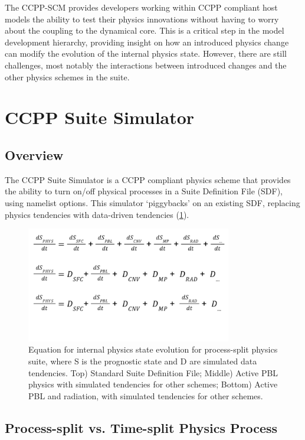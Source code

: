The CCPP-SCM provides developers working within CCPP compliant host models the ability to test their physics innovations without having to worry about the coupling to the dynamical core. This is a critical step in the model development hierarchy, providing insight on how an introduced physics change can modify the evolution of the internal physics state. However, there are still challenges, most notably the interactions between introduced changes and the other physics schemes in the suite.

\section{CCPP Suite Simulator}

\subsection{Overview}

The CCPP Suite Simulator is a CCPP compliant physics scheme that provides the ability to turn on/off physical processes in a Suite Definition File (SDF), using namelist options. This simulator `piggybacks' on an existing SDF, replacing physics tendencies with data-driven tendencies (\ref{fig:CSS_tendency_schematic}). 

\begin{figure}[h]
    \centering
    \includegraphics[width=0.80\textwidth]{images/CSS_tendency_schematic.png}
    \caption{Equation for internal physics state evolution for process-split physics suite, where S is the prognostic state and D are simulated data tendencies. Top) Standard Suite Definition File; Middle) Active PBL physics with simulated tendencies for other schemes; Bottom) Active PBL and radiation, with simulated tendencies for other schemes.}
    \label{fig:CSS_tendency_schematic}
\end{figure}

\subsection{Process-split vs. Time-split Physics Process}

